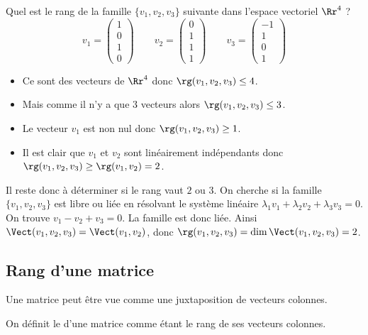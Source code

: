 \documentclass[class=report,crop=false]{standalone}
\begin{document}
\begin{exemple}
Quel est le rang de la famille $\{v_1,v_2,v_3\}$ suivante dans l'espace vectoriel $\Rr^4$ ?
$$
v_1 = \begin{pmatrix} 1\\0\\1\\0 \end{pmatrix} \qquad
v_2 = \begin{pmatrix} 0\\1\\1\\1 \end{pmatrix} \qquad
v_3 = \begin{pmatrix} -1\\1\\0\\1 \end{pmatrix}$$

\begin{itemize}
  \item Ce sont des vecteurs de $\Rr^4$ donc $\rg(v_1,v_2,v_3) \le 4$.
  \item Mais comme il n'y a que $3$ vecteurs alors $\rg(v_1,v_2,v_3) \le 3$.
  \item Le vecteur $v_1$ est non nul donc $\rg(v_1,v_2,v_3) \ge 1$.
  \item Il est clair que $v_1$ et $v_2$ sont linéairement indépendants donc
  $\rg(v_1,v_2,v_3) \ge \rg(v_1,v_2)=2$.
\end{itemize}

Il reste donc à déterminer si le rang vaut $2$ ou $3$.
On cherche si la famille $\{v_1,v_2,v_3\}$ est libre ou liée en résolvant le système linéaire
$\lambda_1 v_1 + \lambda_2 v_2 + \lambda_3 v_3 = 0$. On trouve
$v_1-v_2+v_3=0$. La famille est donc liée.
Ainsi $\Vect(v_1,v_2,v_3)= \Vect(v_1,v_2)$, donc
$\rg (v_1,v_2,v_3) = \dim \Vect(v_1,v_2,v_3) = 2$.
\end{exemple}





\subsection{Rang d'une matrice}


Une matrice peut être vue comme une juxtaposition de vecteurs colonnes.
\begin{definition}
On définit le  d'une matrice comme étant le rang de ses vecteurs colonnes.
\end{definition}
\end{document}

